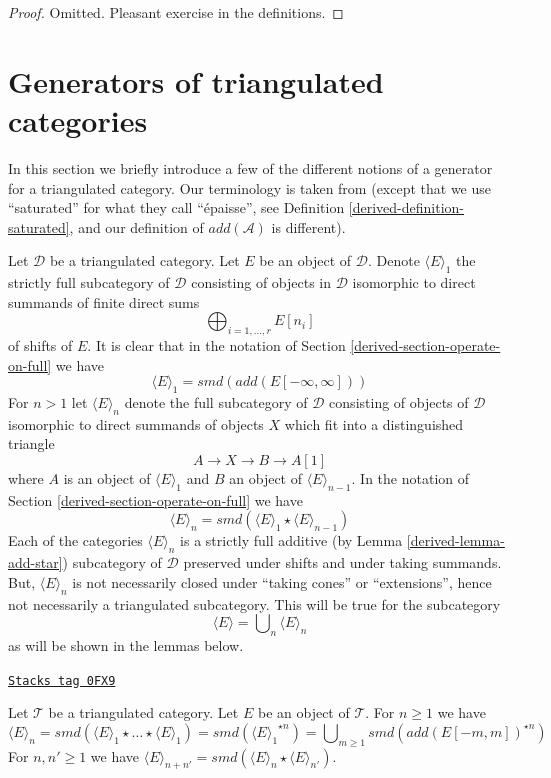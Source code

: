 \begin{proof}
Omitted. Pleasant exercise in the definitions.
\end{proof}

\section{Generators of triangulated categories}
\label{derived-section-generators}
In this section we briefly introduce a few of the different notions
of a generator for a triangulated category. Our terminology is
taken from \cite{BvdB} (except that we use ``saturated'' for what
they call ``\'epaisse'', see Definition \ref{derived-definition-saturated}, and
our definition of $add(\mathcal{A})$ is different).

\medskip\noindent
Let $\mathcal{D}$ be a triangulated category. Let $E$ be an object
of $\mathcal{D}$. Denote $\langle E \rangle_1$ the strictly full subcategory
of $\mathcal{D}$ consisting of objects in $\mathcal{D}$ isomorphic to
direct summands of finite direct sums
$$
\bigoplus\nolimits_{i = 1, \ldots, r} E[n_i]
$$
of shifts of $E$. It is clear that in the notation of
Section \ref{derived-section-operate-on-full} we have
$$
\langle E \rangle_1 = smd(add(E[-\infty, \infty]))
$$
For $n > 1$ let $\langle E \rangle_n$ denote the full
subcategory of $\mathcal{D}$ consisting of objects of $\mathcal{D}$
isomorphic to direct summands of objects $X$ which fit into a distinguished
triangle
$$
A \to X \to B \to A[1]
$$
where $A$ is an object of $\langle E \rangle_1$ and $B$ an object of
$\langle E \rangle_{n - 1}$. In the notation of
Section \ref{derived-section-operate-on-full} we have
$$
\langle E \rangle_n = smd(\langle E \rangle_1 \star \langle E \rangle_{n - 1})
$$
Each of the categories $\langle E \rangle_n$ is a strictly full additive
(by Lemma \ref{derived-lemma-add-star}) subcategory of $\mathcal{D}$ preserved
under shifts and under taking summands. But, $\langle E \rangle_n$ is not
necessarily closed under ``taking cones'' or ``extensions'', hence not
necessarily a triangulated subcategory. This will be true for the
subcategory
$$
\langle E \rangle = \bigcup\nolimits_n \langle E \rangle_n
$$
as will be shown in the lemmas below.

\begin{lemma}
\label{derived-lemma-generated-by-E-explicit}
\href{https://stacks.math.columbia.edu/tag/0FX9}{\texttt{Stacks tag 0FX9}}

Let $\mathcal{T}$ be a triangulated category. Let $E$ be an object
of $\mathcal{T}$. For $n \geq 1$ we have
$$
\langle E \rangle_n =
smd(\langle E \rangle_1 \star \ldots \star \langle E \rangle_1) =
smd({\langle E \rangle_1}^{\star n}) =
\bigcup\nolimits_{m \geq 1} smd(add(E[-m, m])^{\star n})
$$
For $n, n' \geq 1$ we have $\langle E \rangle_{n + n'} =
smd(\langle E \rangle_n \star \langle E \rangle_{n'})$.
\end{lemma}

